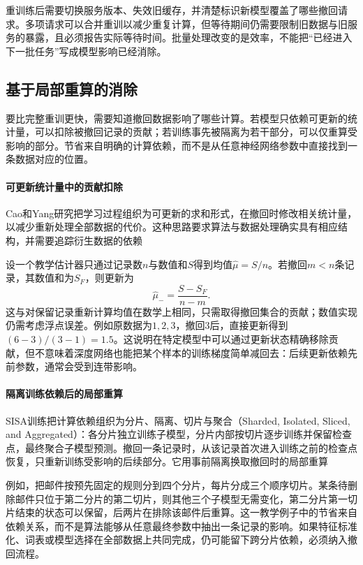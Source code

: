 重训练后需要切换服务版本、失效旧缓存，并清楚标识新模型覆盖了哪些撤回请求。多项请求可以合并重训以减少重复计算，但等待期间仍需要限制旧数据与旧服务的暴露，且必须报告实际等待时间。批量处理改变的是效率，不能把“已经进入下一批任务”写成模型影响已经消除。

\subsection{基于局部重算的消除}
\label{sec:privacy-unlearning-recompute}

要比完整重训更快，需要知道撤回数据影响了哪些计算。若模型只依赖可更新的统计量，可以扣除被撤回记录的贡献；若训练事先被隔离为若干部分，可以仅重算受影响的部分。节省来自明确的计算依赖，而不是从任意神经网络参数中直接找到一条数据对应的位置。

\paragraph{可更新统计量中的贡献扣除}

Cao和Yang研究把学习过程组织为可更新的求和形式，在撤回时修改相关统计量，以减少重新处理全部数据的代价。这种思路要求算法与数据处理确实具有相应结构，并需要追踪衍生数据的依赖

设一个教学估计器只通过记录数$n$与数值和$S$得到均值$\hat\mu=S/n$。若撤回$m<n$条记录，其数值和为$S_F$，则更新为
\[
 \hat\mu_- =\frac{S-S_F}{n-m}.
\]
这与对保留记录重新计算均值在数学上相同，只需取得撤回集合的贡献；数值实现仍需考虑浮点误差。例如原数据为$1,2,3$，撤回3后，直接更新得到$(6-3)/(3-1)=1.5$。这说明在特定模型中可以通过更新状态精确移除贡献，但不意味着深度网络也能把某个样本的训练梯度简单减回去：后续更新依赖先前参数，通常会受到连带影响。

\paragraph{隔离训练依赖后的局部重算}

SISA训练把计算依赖组织为分片、隔离、切片与聚合（Sharded, Isolated, Sliced, and Aggregated）：各分片独立训练子模型，分片内部按切片逐步训练并保留检查点，最终聚合子模型预测。撤回一条记录时，从该记录首次进入训练之前的检查点恢复，只重新训练受影响的后续部分。它用事前隔离换取撤回时的局部重算

例如，把邮件按预先固定的规则分到四个分片，每片分成三个顺序切片。某条待删除邮件只位于第二分片的第二切片，则其他三个子模型无需变化，第二分片第一切片结束的状态可以保留，后两片在排除该邮件后重算。这一教学例子中的节省来自依赖关系，而不是算法能够从任意最终参数中抽出一条记录的影响。如果特征标准化、词表或模型选择在全部数据上共同完成，仍可能留下跨分片依赖，必须纳入撤回流程。

